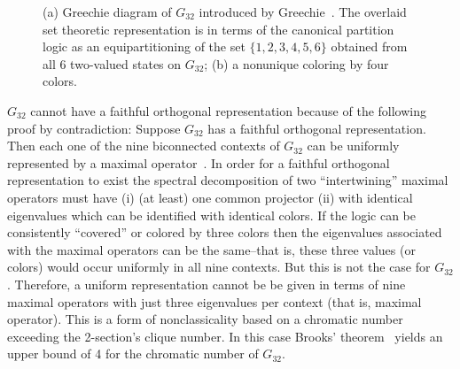 \documentclass[%
12pt,
prereprint,
showpacs,
showkeys,
preprintnumbers,
amsmath,amssymb,
aps,
pra,
longbibliography,
notitlepage
]{revtex4-1}
\theoremstyle{definition}
\begin{document}
\begin{figure}
\begin{center}
\begin{tabular}{ c c c }
                        \end{tabular}
                \end{center}
                \caption{\label{2020-f-GreechieG32}
                        (a) Greechie diagram of $G_{32}$ introduced by Greechie~\cite[Figure~6, p.~121]{greechie:71}.
                        The overlaid set theoretic representation is in terms of
                        the canonical partition logic as an equipartitioning of the set $\{1,2,3,4,5,6\}$
                        obtained from all 6 two-valued states on $G_{32}$;
                        (b) a nonunique coloring by four colors.
                }
        \end{figure}

        $G_{32}$  cannot have a faithful orthogonal representation because of the following proof by contradiction:
        Suppose $G_{32}$  has a faithful orthogonal representation.
        Then each one of the nine biconnected contexts of $G_{32}$ can be  uniformly represented by a
        maximal operator~\cite[\S~84, p.~171,172]{halmos-vs}. In order for a faithful orthogonal
        representation to exist the spectral decomposition of two ``intertwining'' maximal
        operators must have (i) (at least) one common projector (ii) with identical eigenvalues which can be identified with identical colors.
        If the logic can be consistently ``covered'' or colored by three colors then the eigenvalues associated with the maximal operators can be the same--that is, these three values (or colors) would occur uniformly in all nine contexts.
        But this is not the case for $G_{32}$. Therefore, a uniform representation cannot be be given in terms of nine maximal operators with just three eigenvalues per context (that is, maximal operator).
        This is a form of nonclassicality based on a chromatic number exceeding the 2-section's clique number.
        In this case Brooks' theorem~\cite{Brooks1941,Lovasz1975} yields an upper bound of 4 for the chromatic number of $G_{32}$.
\end{document}
